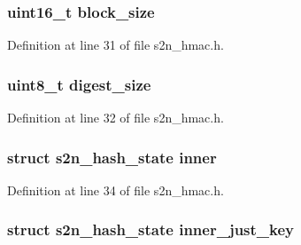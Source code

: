 \subsubsection[{\texorpdfstring{block\+\_\+size}{block_size}}]{\setlength{\rightskip}{0pt plus 5cm}uint16\+\_\+t block\+\_\+size}\hypertarget{structs2n__hmac__state_a9d83aa5f365f4a1b62dd70bd1ae426a3}{}\label{structs2n__hmac__state_a9d83aa5f365f4a1b62dd70bd1ae426a3}


Definition at line 31 of file s2n\+\_\+hmac.\+h.

\subsubsection[{\texorpdfstring{digest\+\_\+size}{digest_size}}]{\setlength{\rightskip}{0pt plus 5cm}uint8\+\_\+t digest\+\_\+size}\hypertarget{structs2n__hmac__state_a1095510d3cd778f68d04742971c79b5b}{}\label{structs2n__hmac__state_a1095510d3cd778f68d04742971c79b5b}


Definition at line 32 of file s2n\+\_\+hmac.\+h.

\subsubsection[{\texorpdfstring{inner}{inner}}]{\setlength{\rightskip}{0pt plus 5cm}struct {\bf s2n\+\_\+hash\+\_\+state} inner}\hypertarget{structs2n__hmac__state_aaa037d7ea69f079ef9413e71714fc357}{}\label{structs2n__hmac__state_aaa037d7ea69f079ef9413e71714fc357}


Definition at line 34 of file s2n\+\_\+hmac.\+h.

\subsubsection[{\texorpdfstring{inner\+\_\+just\+\_\+key}{inner_just_key}}]{\setlength{\rightskip}{0pt plus 5cm}struct {\bf s2n\+\_\+hash\+\_\+state} inner\+\_\+just\+\_\+key}\hypertarget{structs2n__hmac__state_afeeaec16595d282576d3b90608ffe94f}{}\label{structs2n__hmac__state_afeeaec16595d282576d3b90608ffe94f}


